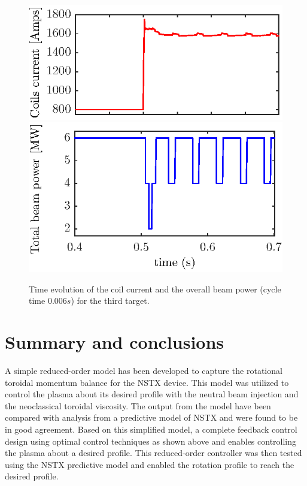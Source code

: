 \documentclass[12pt,lot, lof]{puthesis}
\begin{document}
\begin{figure}
	\centering
	\includegraphics[width=0.67 \linewidth]{fig21a}  \\[-0.5em]
	\includegraphics[width=0.67 \linewidth]{fig21b} 
	\caption{Time evolution of the coil current and the overall beam power (cycle time $0.006 s$) for the third target. }
	\label{fig:rot2020}
\end{figure}

\section{Summary and conclusions}
\label{sec:conclusions}

A simple reduced-order model has been developed to capture the rotational toroidal momentum balance for the NSTX device.  This model was utilized to control the plasma about its desired profile with the neutral beam injection and the neoclassical toroidal viscosity.
The output from the model have been compared with analysis from a predictive model of NSTX and were found to be in good agreement.
Based on this simplified model, a complete feedback control design using optimal control techniques as shown above and enables controlling the plasma about a desired profile. This reduced-order controller was then tested using the NSTX predictive model and enabled the rotation profile to reach the desired profile.
\end{document}
